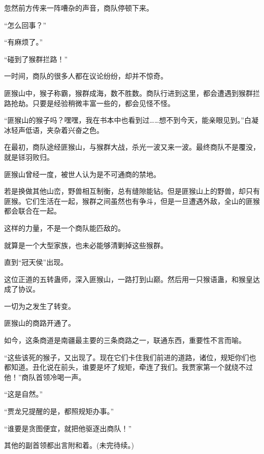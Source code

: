 \begin{this_body}
忽然前方传来一阵嘈杂的声音，商队停顿下来。

“怎么回事？”

“有麻烦了。”

“碰到了猴群拦路！”

一时间，商队的很多人都在议论纷纷，却并不惊奇。

匪猴山中，猴子称霸，猴群成海，数不胜数。商队行进到这里，都会遭遇到猴群拦路抢劫。只要是经验稍微丰富一些的，都会见怪不怪。

“匪猴山的猴子吗？嘿嘿，我在书本中也看到过……想不到今天，能亲眼见到。”白凝冰轻声低语，夹杂着兴奋之色。

在最初，商队途经匪猴山，与猴群大战，杀光一波又来一波。最终商队不是覆没，就是铩羽败归。

匪猴山曾经一度，被世人认为是不可通商的禁地。

若是换做其他山峦，野兽相互制衡，总有缝隙能钻。但是匪猴山上的野兽，却只有匪猴。它们生活在一起，猴群之间虽然也有争斗，但是一旦遭遇外敌，全山的匪猴都会联合在一起。

这样的力量，不是一个商队能匹敌的。

就算是一个大型家族，也未必能够清剿掉这些猴群。

直到“冠天侯”出现。

这位正道的五转蛊师，深入匪猴山，一路打到山巅。然后用一只猴语蛊，和猴皇达成了协议。

一切为之发生了转变。

匪猴山的商路开通了。

如今，这条商道是南疆最主要的三条商路之一，联通东西，重要性不言而喻。

“这些该死的猴子，又出现了。现在它们卡住我们前进的道路，诸位，规矩你们也都知道。丑化说在前头，谁要是坏了规矩，牵连了我们。我贾家第一个就绕不过他！”商队首领冷喝一声。

“这是自然。”

“贾龙兄提醒的是，都照规矩办事。”

“谁要是贪图便宜，就把他驱逐出商队！”

其他的副首领都出言附和着。(未完待续。)

\end{this_body}

